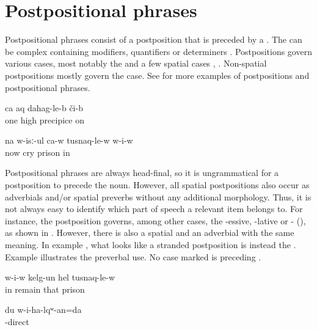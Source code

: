 
\section{Postpositional phrases}
\label{sec:Postpositional phrases}

Postpositional phrases consist of a postposition that is preceded by a . The  can be complex containing modifiers, quantifiers or determiners . Postpositions govern various cases, most notably the  and a few spatial cases , . Non-spatial postpositions mostly govern the  case. See  for more examples of postpositions and postpositional phrases.

\begin{exe}
	\ex	\label{ex:on one high precipice}
	\gll	ca	aq	dahag-le-b či-b\\
		one	high	precipice on\\
	\glt	{}

	\ex	\label{ex:‎Now he is crying in prison}
	\gll	na	w-isː-ul	ca-w	tusnaq-le-w	w-i-w\\
		now	cry		prison	in\\
	\glt	{}
\end{exe}

Postpositional phrases are always head-final, so it is ungrammatical for a postposition to precede the noun. However, all spatial postpositions also occur as adverbials and/or spatial preverbs without any additional morphology. Thus, it is not always easy to identify which part of speech a relevant item belongs to. For instance, the postposition   governs, among other cases, the -essive, -lative or - (), as shown in . However, there is also a spatial   and an adverbial  with the same meaning. In example , what looks like a stranded postposition  is instead the . Example  illustrates the preverbal use. No case marked  is preceding .

\begin{exe}
	\ex	\label{ex:He stayed in prison}
	\gll	w-i-w kelg-un	hel	tusnaq-le-w\\
		in remain	that	prison\\
	\glt	{}

	\ex	\label{ex:I will go inside}
	\gll	du	w-i-ha-lqʷ-an=da\\
			-direct\\
	\glt	{}
\end{exe}
